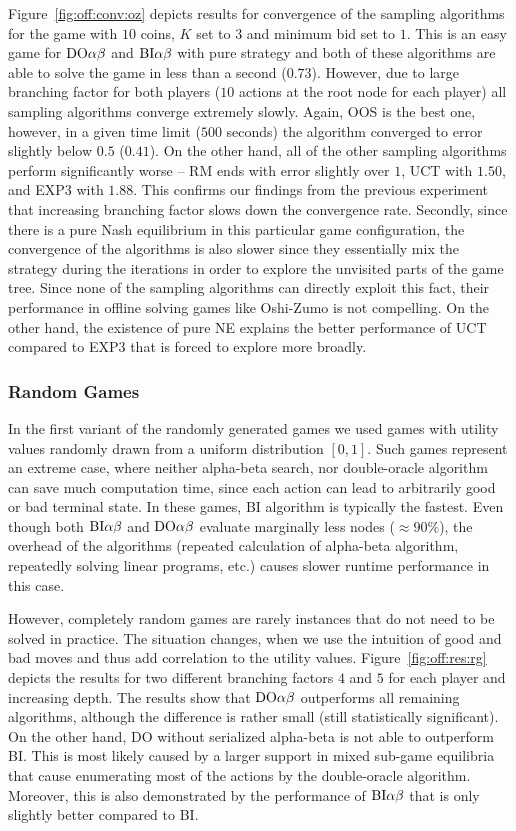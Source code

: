 Figure~\ref{fig:off:conv:oz} depicts results for convergence of the sampling algorithms for the game with $10$ coins, $K$ set to $3$ and minimum bid set to $1$. This is an easy game for $\textrm{DO}\alpha\beta$ and $\textrm{BI}\alpha\beta$ with pure strategy and both of these algorithms are able to solve the game in less than a second ($0.73$). However, due to large branching factor for both players ($10$ actions at the root node for each player) all sampling algorithms converge extremely slowly. Again, OOS is the best one, however, in a given time limit ($500$ seconds) the algorithm converged to error slightly below $0.5$ ($0.41$). On the other hand, all of the other sampling algorithms perform significantly worse -- RM ends with error slightly over $1$, UCT with $1.50$, and EXP3 with $1.88$.
This confirms our findings from the previous experiment that increasing branching factor slows down the convergence rate.
Secondly, since there is a pure Nash equilibrium in this particular game configuration, the convergence of the algorithms is also slower since they essentially mix the strategy during the iterations in order to explore the unvisited parts of the game tree. Since none of the sampling algorithms can directly exploit this fact, their performance in offline solving games like Oshi-Zumo is not compelling. On the other hand, the existence of pure NE explains the better performance of UCT compared to EXP3 that is forced to explore more broadly.

\subsubsection{Random Games}
In the first variant of the randomly generated games we used games with utility values randomly drawn from a uniform distribution $[0,1]$. 
Such games represent an extreme case, where neither alpha-beta search, nor double-oracle algorithm can save much computation time, since each action can lead to arbitrarily good or bad terminal state. 
In these games, \textsc{BI} algorithm is typically the fastest.
Even though both $\textrm{BI}\alpha\beta$ and $\textrm{DO}\alpha\beta$ evaluate marginally less nodes ($\approx90\%$), the overhead of the algorithms (repeated calculation of alpha-beta algorithm, repeatedly solving linear programs, etc.) causes slower runtime performance in this case.

However, completely random games are rarely instances that do not need to be solved in practice.
The situation changes, when we use the intuition of good and bad moves and thus add correlation to the utility values.
Figure~\ref{fig:off:res:rg} depicts the results for two different branching factors $4$ and $5$ for each player and increasing depth.
The results show that $\textrm{DO}\alpha\beta$ outperforms all remaining algorithms, although the difference is rather small (still statistically significant).
On the other hand, \textsc{DO} without serialized alpha-beta is not able to outperform \textsc{BI}. 
This is most likely caused by a larger support in mixed sub-game equilibria that cause enumerating most of the actions by the double-oracle algorithm. 
Moreover, this is also demonstrated by the performance of $\textrm{BI}\alpha\beta$ that is only slightly better compared to \textsc{BI}.

